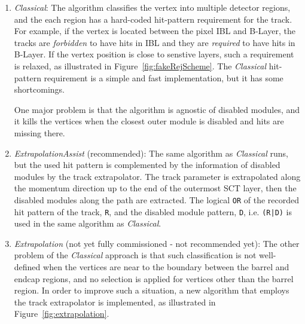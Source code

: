 \documentclass[NOTE, atlasdraft=true, texlive=2018, UKenglish]{\ATLASLATEXPATH atlasdoc}
\begin{document}
\begin{enumerate}
\item \emph{Classical}: The algorithm classifies the vertex into multiple detector regions, and the each region has a hard-coded hit-pattern requirement for the track. For example, if the vertex is located between the pixel IBL and B-Layer, the tracks are \emph{forbidden} to have hits in IBL and they are \emph{required} to have hits in B-Layer. If the vertex position is close to senstive layers, such a requirement is relaxed, as illustrated in Figure~\ref{fig:fakeRejScheme}. The \emph{Classical} hit-pattern requirement is a simple and fast implementation, but it has some shortcomings.

One major problem is that the algorithm is agnostic of disabled modules, and it kills the vertices when the closest outer module is disabled and hits are missing there.

\item \emph{ExtrapolationAssist} (recommended): The same algorithm as \emph{Classical} runs, but the used hit pattern is complemented by the information of disabled modules by the track extrapolator. The track parameter is extrapolated along the momentum direction up to the end of the outermost SCT layer, then the disabled modules along the path are extracted. The logical {\tt OR} of the recorded hit pattern of the track, {\tt R}, and the disabled module pattern, {\tt D}, i.e. {\tt (R|D)} is used in the same algorithm as \emph{Classical}.

\item \emph{Extrapolation} (not yet fully commissioned - not recommended yet):  The other problem of the \emph{Classical} approach is that such classification is not well-defined when the vertices are near to the boundary between the barrel and endcap regions, and no selection is applied for vertices other than the barrel region. In order to improve such a situation, a new algorithm that employs the track extrapolator is implemented, as illustrated in Figure~\ref{fig:extrapolation}. 


\end{enumerate}
\end{document}
